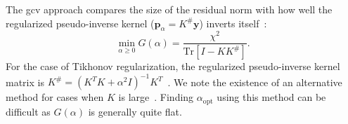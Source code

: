 The \gls{gcv} approach compares the size of the residual norm with how well the regularized pseudo-inverse kernel ($\mathbf{p}_\alpha = K^\#\mathbf{y}$) inverts itself~\cite{1978-Craven-NM-31-377}:
%
\begin{equation}
\label{eq:gcv}
   \min_{\alpha \geq 0} G ( \alpha ) = \frac{ \chi^2 }{\mathrm{Tr} \left [ I - K K^\# \right]}.
\end{equation}
%
For the case of Tikhonov regularization, the regularized pseudo-inverse kernel matrix is $K^\# = \left ( K^T K + \alpha^2 I \right )^{-1} K^{T}$~\cite{Zou2016}. We note the existence of an alternative method for cases when $K$ is large~\cite{1997-Golub-JCGS-6-1}. Finding $\alpha_\mathrm{opt}$ using this method can be difficult as $G ( \alpha )$ is generally quite flat.